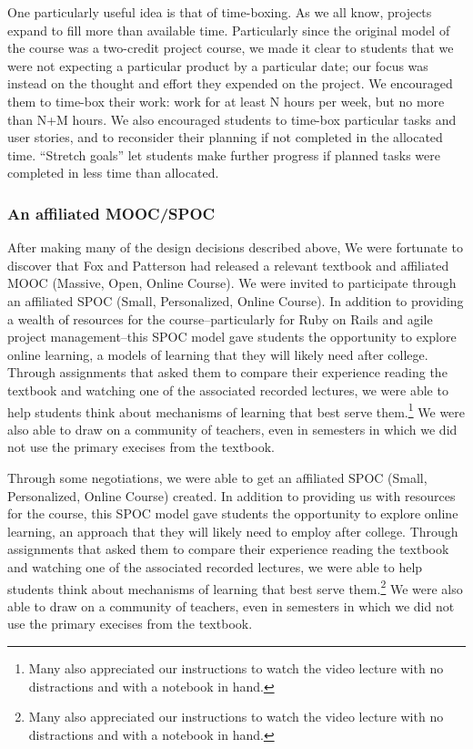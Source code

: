 One particularly useful idea is that of time-boxing.
As we all know, projects expand to fill more than available time.
Particularly since the original model of the course was a two-credit
project course, we made it clear to students that we were not expecting
a particular product by a particular date; our focus was instead on the
thought and effort they expended on the project.  We encouraged them
to time-box their work: work for at least N hours per week, but no more
than N+M hours.  We also encouraged students to time-box particular tasks 
and user stories, and to reconsider their planning if not completed in the 
allocated time.  ``Stretch goals'' let students make further progress 
if planned tasks were completed in less time than allocated.  

\subsubsection{An affiliated MOOC/SPOC}

After making many of the design decisions described above, We were
fortunate to discover that Fox and Patterson had released a relevant
textbook \cite{saasbook} and affiliated MOOC (Massive, Open, Online
Course).  We were invited to participate through an affiliated SPOC
(Small, Personalized, Online Course).  In addition to providing a
wealth of resources for the course--particularly for Ruby on Rails
and agile project management--this SPOC model gave students the
opportunity to explore online learning, a models of learning
that they will likely need after college.  Through
assignments that asked them to compare their experience reading the
textbook and watching one of the associated recorded lectures, we
were able to help students think about mechanisms of learning that
best serve them.\footnote{Many also appreciated our instructions
to watch the video lecture with no distractions and with a notebook
in hand.}  We were also able to draw on a community of teachers,
even in semesters in which we did not use the primary execises from
the textbook.

Through some negotiations, we were able to get an affiliated
SPOC (Small, Personalized, Online Course) created.  In addition to
providing us with resources for the course, this SPOC model gave
students the opportunity to explore online learning, an approach
that they will likely need to employ after college.  Through
assignments that asked them to compare their experience reading the
textbook and watching one of the associated recorded lectures, we
were able to help students think about mechanisms of learning that
best serve them.\footnote{Many also appreciated our instructions
to watch the video lecture with no distractions and with a notebook
in hand.}  We were also able to draw on a community of teachers,
even in semesters in which we did not use the primary execises from
the textbook.


